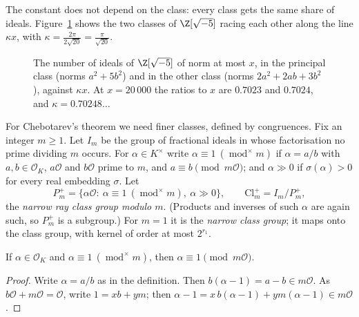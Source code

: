 The constant does not depend on the class: every class gets the same share of ideals. Figure~\ref{fig:idealcount} shows the two
classes of $\Z[\sqrt{-5}]$ racing each other along the line $\kappa x$, with $\kappa=\frac{2\pi}{2\sqrt{20}}=\frac\pi{\sqrt{20}}$.

\begin{figure}[ht]
\centering
{}
\caption{The number of ideals of $\Z[\sqrt{-5}]$ of norm at most $x$, in the principal class (norms $a^2+5b^2$) and in the other class
(norms $2a^2+2ab+3b^2$), against $\kappa x$. At $x=20\,000$ the ratios to $x$ are $0.7023$ and $0.7024$, and $\kappa=0.70248\ldots$}
\label{fig:idealcount}
\end{figure}

For Chebotarev's theorem we need finer classes, defined by congruences. Fix an integer $m\ge1$. Let $I_m$ be the group of fractional
ideals in whose factorisation no prime dividing $m$ occurs. For $\alpha\in K^\times$ write $\alpha\equiv1\ (\operatorname{mod}^\times m)$ if $\alpha=a/b$
with $a,b\in\mathcal O_K$, $a\mathcal O$ and $b\mathcal O$ prime to $m$, and $a\equiv b\pmod{m\mathcal O}$; and $\alpha\gg0$ if
$\sigma(\alpha)>0$ for every real embedding $\sigma$. Let
\[
P_m^+=\{\alpha\mathcal O:\ \alpha\equiv1\ (\operatorname{mod}^\times m),\ \alpha\gg0\},\qquad \mathrm{Cl}_m^+=I_m/P_m^+ ,
\]
the \emph{narrow ray class group modulo $m$}. (Products and inverses of such $\alpha$ are again such, so $P_m^+$ is a subgroup.) For
$m=1$ it is the \emph{narrow class group}; it maps onto the class group, with kernel of order at most $2^{r_1}$.

\begin{lemma}\label{lem:mult}
If $\alpha\in\mathcal O_K$ and $\alpha\equiv1\ (\operatorname{mod}^\times m)$, then $\alpha\equiv1\pmod{m\mathcal O}$.
\end{lemma}
\begin{proof}
Write $\alpha=a/b$ as in the definition. Then $b(\alpha-1)=a-b\in m\mathcal O$. As $b\mathcal O+m\mathcal O=\mathcal O$, write
$1=xb+ym$; then $\alpha-1=x\,b(\alpha-1)+ym(\alpha-1)\in m\mathcal O$.
\end{proof}

